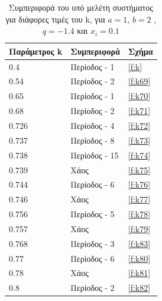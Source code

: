 \begin{table}[ht]
	\centering
	\caption{ Συμπεριφορά του υπό μελέτη συστήματος για διάφορες τιμές του k, για $a = 1$, $b = 2$ , $q=-1.4$ και
		\(x_i=0.1\)}
	\label{tab:abc6}
	\begin{tabular}{l | l | l}
		Παράμετρος k & Συμπεριφορά & Σχήμα\\
		\hline
		0.4 &  Περίοδος -  1 & \ref{f:k}\\
		0.54 &  Περίοδος -  2 & \ref{f:k69}\\
		0.65& Περίοδος -  1 & \ref{f:k70}\\
		0.68& Περίοδος -  2 & \ref{f:k71}\\
		0.726 &  Περίοδος -  4 & \ref{f:k72}\\
		0.737& Περίοδος -  8 & \ref{f:k73}\\
		0.738& Περίοδος -  15 & \ref{f:k74}\\
		0.739& Χάος & \ref{f:k75}\\
		0.744 &  Περίοδος -  6 & \ref{f:k76}\\
		0.746 &  Χάος & \ref{f:k77}\\
		0.756 &  Περίοδος -  5 & \ref{f:k78}\\
		0.757 &  Χάος & \ref{f:k79}\\
		0.768 &  Περίοδος -  3 & \ref{f:k83}\\
		0.77 &  Περίοδος -  6 & \ref{f:k80}\\
		0.78 &  Χάος & \ref{f:k81}\\
		0.8 & Περίοδος -  2&\ref{f:k82}\\
	\end{tabular}
\end{table}

